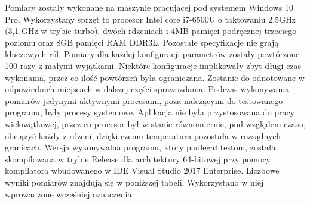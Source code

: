 \documentclass[a4paper]{article}
\begin{document}
Pomiary zostały wykonane na maszynie pracującej pod systemem Windows 10 Pro. Wykorzystany sprzęt to procesor Intel core i7-6500U o taktowaniu 2,5GHz (3,1 GHz w trybie turbo), dwóch rdzeniach i 4MB pamięci podręcznej trzeciego poziomu oraz 8GB pamięci RAM DDR3L. Pozostałe specyfikacje nie grają kluczowych ról. Pomiary dla każdej konfiguracji parametrów zostały powtórzone 100 razy z małymi wyjątkami. Niektóre konfiguracje implikowały zbyt długi czas wykonania, przez co ilość powtórzeń była ograniczana. Zostanie do odnotowane w odpowiednich miejscach w dalszej części sprawozdania. Podczas wykonywania pomiarów jedynymi aktywnymi procesami, poza należącymi do testowanego programu, były procesy systemowe. Aplikacja nie była przystosowana do pracy wielowątkowej, przez co procesor był w stanie równomiernie, pod względem czasu, obciążyć każdy z rdzeni, dzięki czemu temperatura pozostała w rozsądnych granicach. Wersja wykonywalna programu, który podlegał testom, została skompilowana w trybie Release dla architektury 64-bitowej przy pomocy kompilatora wbudowanego w IDE Visual Studio 2017 Enterprise. Liczbowe wyniki pomiarów znajdują się w poniższej tabeli. Wykorzystano w niej wprowadzone wcześniej oznaczenia.
\end{document}
